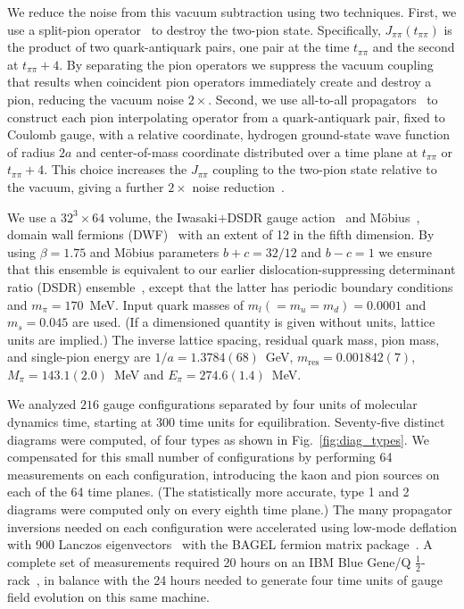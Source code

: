 \documentclass[aps,prl,
superscriptaddress,
showpacs,
preprintnumbers,
bibnotes,
amsmath,
amssymb,
twocolumn,
floatfix,
]{revtex4-1}
\newcommand{\ncfigs}{216}
\begin{document}
We reduce the noise from this vacuum subtraction using two techniques.  First, we use a split-pion operator~\cite{QLiu_thesis} to destroy the two-pion state.  Specifically, $J_{\pi\pi}(t_{\pi\pi})$ is the product of two quark-antiquark pairs, one pair at the time $t_{\pi\pi}$ and the second at $t_{\pi\pi}+4$.  By separating the pion operators we suppress 
the vacuum coupling that results when coincident pion operators immediately create and destroy a pion, reducing the vacuum noise $2\times$.  Second, we use all-to-all propagators~\cite{Foley:2005ac, Kaneko:2010ru} to construct each pion interpolating operator from a quark-antiquark pair, fixed to Coulomb gauge, with a relative coordinate, hydrogen ground-state wave function of radius $2a$ and center-of-mass coordinate distributed over a time plane at $t_{\pi\pi}$ or $t_{\pi\pi}+4$.  This choice increases the $J_{\pi\pi}$ coupling to the two-pion state relative to the vacuum, giving a further $2\times$ noise reduction~\cite{Zhang:2014ddl}.

We use a $32^3\times64$ volume, the Iwasaki$+$DSDR gauge action~\cite{Renfrew:2009wu} and M\"obius~\cite{Brower:2012vk}, domain wall fermions (DWF)~\cite{Furman:1995ky} with an extent of 12 in the fifth dimension.  By using $\beta=1.75$ and M\"obius parameters $b+c=32/12$ and $b-c=1$ we ensure that this ensemble is equivalent to our earlier dislocation-suppressing determinant ratio (DSDR) ensemble~\cite{Arthur:2012opa}, except that the latter has periodic boundary conditions and $m_\pi=170$~MeV.  Input quark masses of $m_l(=m_u=m_d)=0.0001$ and $m_s=0.045$ are used.   (If a dimensioned quantity is given without units, lattice units are implied.)  The inverse lattice spacing, residual quark mass, pion mass, and single-pion energy
are $1/a=1.3784(68)$~GeV, $m_{\mathrm{res}}=0.001842(7)$, $M_\pi=143.1(2.0)$~MeV and $E_\pi = 274.6(1.4)$~MeV.

We analyzed $\ncfigs$ gauge configurations separated by four units of molecular dynamics time, starting at 300 time units for equilibration. Seventy-five distinct diagrams were computed, of four types as shown in Fig.~\ref{fig:diag_types}.  We compensated for this small number of configurations by performing 64 measurements on each configuration, introducing the kaon and pion sources on each of the 64 time planes.  (The statistically more accurate, type 1 and 2 diagrams were computed only on every eighth time plane.)  The many propagator inversions needed on each configuration were accelerated using low-mode deflation with 900 Lanczos eigenvectors~\cite{Shintani:2014vja} with the BAGEL fermion matrix package~\cite{Boyle:2009vp}.  A complete set of measurements required 20 hours on an IBM Blue Gene/Q $\frac{1}{2}$-rack~\cite{Boyle:2012iy}, in balance with the 24 hours needed to generate four time units of gauge field evolution on this same machine.
\end{document}
